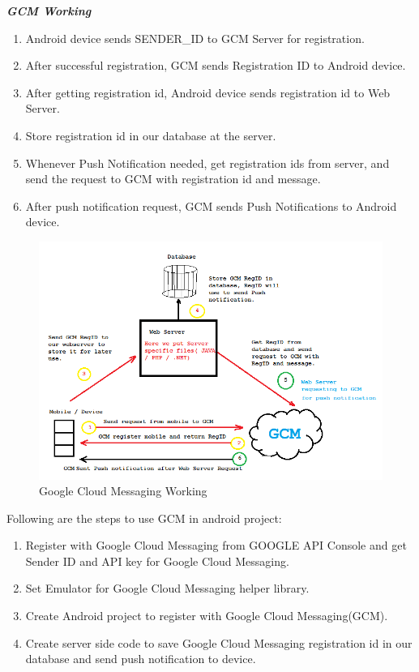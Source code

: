 \textbf{\emph{GCM Working}}
\begin{enumerate}
\item Android device sends SENDER\_ID to GCM Server for registration.
\item After successful registration, GCM sends Registration ID to Android device.
\item After getting registration id, Android device sends registration id to Web Server.
\item Store registration id in our database at the server.
\item Whenever Push Notification needed, get registration ids from server, and send the request to GCM with registration id and message.
\item After push notification request, GCM sends Push Notifications to Android device.
\end{enumerate}

\begin{figure}[H]
\centering \includegraphics[scale=0.5]{image/gcm.png}
\caption{Google Cloud Messaging Working}
\end{figure}
Following are the steps to use GCM in android project:
\begin{enumerate}
\item Register with Google Cloud Messaging from GOOGLE API Console and get Sender ID and API key for Google Cloud Messaging.
\item Set Emulator for Google Cloud Messaging helper library.
\item Create Android project to register with Google Cloud Messaging(GCM).
\item Create server side code to save Google Cloud Messaging registration id in our database and send push notification to device.
\end{enumerate}

